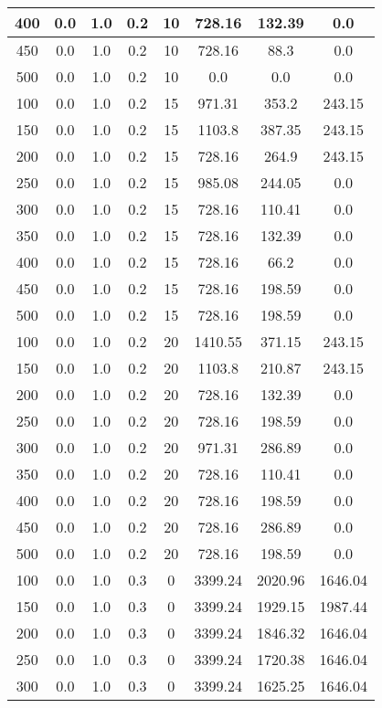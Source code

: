 \documentclass[a4paper, 12pt]{extreport}
\begin{document}
\begin{itemize}
\begin{longtable}{|c|c|c|c|c|c|c|c|}
			400 & 0.0 & 1.0 & 0.2 & 10 & 728.16 & 132.39 & 0.0 \\\hline
			450 & 0.0 & 1.0 & 0.2 & 10 & 728.16 & 88.3 & 0.0 \\\hline
			500 & 0.0 & 1.0 & 0.2 & 10 & 0.0 & 0.0 & 0.0 \\\hline
			100 & 0.0 & 1.0 & 0.2 & 15 & 971.31 & 353.2 & 243.15 \\\hline
			150 & 0.0 & 1.0 & 0.2 & 15 & 1103.8 & 387.35 & 243.15 \\\hline
			200 & 0.0 & 1.0 & 0.2 & 15 & 728.16 & 264.9 & 243.15 \\\hline
			250 & 0.0 & 1.0 & 0.2 & 15 & 985.08 & 244.05 & 0.0 \\\hline
			300 & 0.0 & 1.0 & 0.2 & 15 & 728.16 & 110.41 & 0.0 \\\hline
			350 & 0.0 & 1.0 & 0.2 & 15 & 728.16 & 132.39 & 0.0 \\\hline
			400 & 0.0 & 1.0 & 0.2 & 15 & 728.16 & 66.2 & 0.0 \\\hline
			450 & 0.0 & 1.0 & 0.2 & 15 & 728.16 & 198.59 & 0.0 \\\hline
			500 & 0.0 & 1.0 & 0.2 & 15 & 728.16 & 198.59 & 0.0 \\\hline
			100 & 0.0 & 1.0 & 0.2 & 20 & 1410.55 & 371.15 & 243.15 \\\hline
			150 & 0.0 & 1.0 & 0.2 & 20 & 1103.8 & 210.87 & 243.15 \\\hline
			200 & 0.0 & 1.0 & 0.2 & 20 & 728.16 & 132.39 & 0.0 \\\hline
			250 & 0.0 & 1.0 & 0.2 & 20 & 728.16 & 198.59 & 0.0 \\\hline
			300 & 0.0 & 1.0 & 0.2 & 20 & 971.31 & 286.89 & 0.0 \\\hline
			350 & 0.0 & 1.0 & 0.2 & 20 & 728.16 & 110.41 & 0.0 \\\hline
			400 & 0.0 & 1.0 & 0.2 & 20 & 728.16 & 198.59 & 0.0 \\\hline
			450 & 0.0 & 1.0 & 0.2 & 20 & 728.16 & 286.89 & 0.0 \\\hline
			500 & 0.0 & 1.0 & 0.2 & 20 & 728.16 & 198.59 & 0.0 \\\hline
			100 & 0.0 & 1.0 & 0.3 & 0 & 3399.24 & 2020.96 & 1646.04 \\\hline
			150 & 0.0 & 1.0 & 0.3 & 0 & 3399.24 & 1929.15 & 1987.44 \\\hline
			200 & 0.0 & 1.0 & 0.3 & 0 & 3399.24 & 1846.32 & 1646.04 \\\hline
			250 & 0.0 & 1.0 & 0.3 & 0 & 3399.24 & 1720.38 & 1646.04 \\\hline
			300 & 0.0 & 1.0 & 0.3 & 0 & 3399.24 & 1625.25 & 1646.04 \\\hline

\end{longtable}
\end{itemize}
\end{document}
